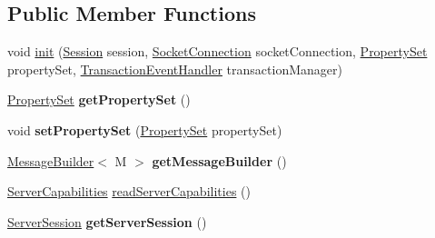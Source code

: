 \subsection*{Public Member Functions}
\begin{DoxyCompactItemize}
\item 
void \mbox{\hyperlink{interfacecom_1_1mysql_1_1cj_1_1protocol_1_1_protocol_a5475394532c7c3ff809b46ee47715bdb}{init}} (\mbox{\hyperlink{interfacecom_1_1mysql_1_1cj_1_1_session}{Session}} session, \mbox{\hyperlink{interfacecom_1_1mysql_1_1cj_1_1protocol_1_1_socket_connection}{Socket\+Connection}} socket\+Connection, \mbox{\hyperlink{interfacecom_1_1mysql_1_1cj_1_1conf_1_1_property_set}{Property\+Set}} property\+Set, \mbox{\hyperlink{interfacecom_1_1mysql_1_1cj_1_1_transaction_event_handler}{Transaction\+Event\+Handler}} transaction\+Manager)
\item 
\mbox{\label{interfacecom_1_1mysql_1_1cj_1_1protocol_1_1_protocol_a131dda37d8f18893894e2671d4c18005}} 
\mbox{\hyperlink{interfacecom_1_1mysql_1_1cj_1_1conf_1_1_property_set}{Property\+Set}} {\bfseries get\+Property\+Set} ()
\item 
\mbox{\label{interfacecom_1_1mysql_1_1cj_1_1protocol_1_1_protocol_a870e0a7a79b5248e942b165fe1a9593c}} 
void {\bfseries set\+Property\+Set} (\mbox{\hyperlink{interfacecom_1_1mysql_1_1cj_1_1conf_1_1_property_set}{Property\+Set}} property\+Set)
\item 
\mbox{\label{interfacecom_1_1mysql_1_1cj_1_1protocol_1_1_protocol_a6a924ac14232063c3eab7b70a376ab29}} 
\mbox{\hyperlink{interfacecom_1_1mysql_1_1cj_1_1_message_builder}{Message\+Builder}}$<$ M $>$ {\bfseries get\+Message\+Builder} ()
\item 
\mbox{\hyperlink{interfacecom_1_1mysql_1_1cj_1_1protocol_1_1_server_capabilities}{Server\+Capabilities}} \mbox{\hyperlink{interfacecom_1_1mysql_1_1cj_1_1protocol_1_1_protocol_ac7608c87247ae3467a9f1e3e8c254042}{read\+Server\+Capabilities}} ()
\item 
\mbox{\label{interfacecom_1_1mysql_1_1cj_1_1protocol_1_1_protocol_a1dade0f0b8da9ec87055ff8b86323bd3}} 
\mbox{\hyperlink{interfacecom_1_1mysql_1_1cj_1_1protocol_1_1_server_session}{Server\+Session}} {\bfseries get\+Server\+Session} ()

\end{DoxyCompactItemize}

